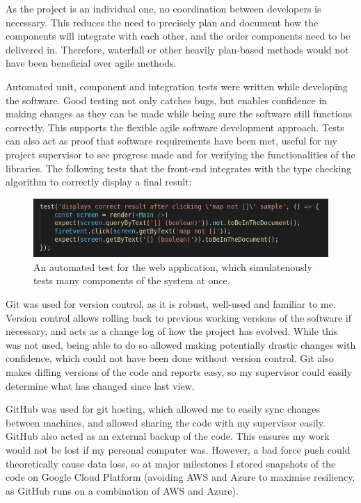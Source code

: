 \documentclass[a4paper,fleqn,twoside,12pt]{report}
\begin{document}
As the project is an individual one, no coordination between developers is necessary. This reduces the need to precisely plan and document how the components will integrate with each other, and the order components need to be delivered in. Therefore, waterfall or other heavily plan-based methods would not have been beneficial over agile methods.

Automated unit, component and integration tests were written while developing the software. Good testing not only catches bugs, but enables confidence in making changes as they can be made while being sure the software still functions correctly. This supports the flexible agile software development approach. Tests can also act as proof that software requirements have been met, useful for my project supervisor to see progress made and for verifying the functionalities of the libraries. The following tests that the front-end integrates with the type checking algorithm to correctly display a final result:

\begin{figure}[h!]
  \centering
  \includegraphics[width=1.000\linewidth]{images/image18.png}
  \caption{An automated test for the web application, which simulatenously tests many components of the system at once.}
\end{figure}

Git was used for version control, as it is robust, well-used and familiar to me. Version control allows rolling back to previous working versions of the software if necessary, and acts as a change log of how the project has evolved. While this was not used, being able to do so allowed making potentially drastic changes with confidence, which could not have been done without version control. Git also makes diffing versions of the code and reports easy, so my supervisor could easily determine what has changed since last view.

GitHub was used for git hosting, which allowed me to easily sync changes between machines, and allowed sharing the code with my supervisor easily. GitHub also acted as an external backup of the code. This ensures my work would not be lost if my personal computer was. However, a bad force push could theoretically cause data loss, so at major milestones I stored snapshots of the code on Google Cloud Platform (avoiding AWS and Azure to maximise resiliency, as GitHub runs on a combination of AWS and Azure).
\end{document}
